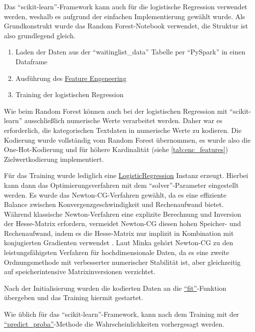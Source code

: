 Das \enquote{scikit-learn}-Framework kann auch für die logistische Regression verwendet werden, weshalb es aufgrund der einfachen Implementierung gewählt wurde. 
Als Grundkonstrukt wurde das Random Forest-Notebook verwendet, die Struktur ist also grundlegend gleich.
\begin{enumerate}[noitemsep]
    \item Laden der Daten aus der \enquote{waitinglist\_data} Tabelle per \enquote{PySpark} in einen Dataframe
    \item Ausführung des \hyperref[sec:feature_engeneering]{Feature Engeneering}
    \item Training der logistischen Regression
\end{enumerate}

Wie beim Random Forest können auch bei der logistischen Regression mit \enquote{scikit-learn} ausschließlich numerische Werte verarbeitet werden.
Daher war es erforderlich, die kategorischen Textdaten in numerische Werte zu kodieren.
Die Kodierung wurde vollständig vom Random Forest übernommen, es wurde also die One-Hot-Kodierung und für höhere Kardinalität (siehe \ref{tab:enc_features}) Zielwertkodierung implementiert.

Für das Training wurde lediglich eine 
\href{https://scikit-learn.org/stable/modules/generated/sklearn.linear_model.LogisticRegression.html}{LogisticRegression}
Instanz erzeugt. Hierbei kann dann das Optimierungsverfahren mit dem \enquote{solver}-Parameter eingestellt werden.
Es wurde das Newton-CG-Verfahren gewählt, da es eine effiziente Balance zwischen Konvergenzgeschwindigkeit und Rechenaufwand bietet. Während klassische Newton-Verfahren eine explizite Berechnung und Inversion der Hesse-Matrix erfordern, vermeidet Newton-CG diesen hohen Speicher- und Rechenaufwand, indem es die Hesse-Matrix nur implizit in Kombination mit konjugierten Gradienten verwendet \cite{Minka2003}. 
Laut Minka \cite{Minka2003} gehört Newton-CG zu den leistungsfähigsten Verfahren für hochdimensionale Daten, da es eine zweite Ordnungsmethode mit verbesserter numerischer Stabilität ist, aber gleichzeitig auf speicherintensive Matrixinversionen verzichtet. 

Nach der Initialisierung wurden die kodierten Daten an die
\href{https://scikit-learn.org/stable/modules/generated/sklearn.linear_model.LogisticRegression.html#sklearn.linear_model.LogisticRegression.fit}{\enquote{fit}}-Funktion übergeben und das Training hiermit gestartet.

Wie üblich für das \enquote{scikit-learn}-Framework, kann nach dem Training mit der 
\href{https://scikit-learn.org/stable/modules/generated/sklearn.linear_model.LogisticRegression.html#sklearn.linear_model.LogisticRegression.predict_proba}{\enquote{predict\_proba}}-Methode die Wahrscheinlichkeiten vorhergesagt werden.

